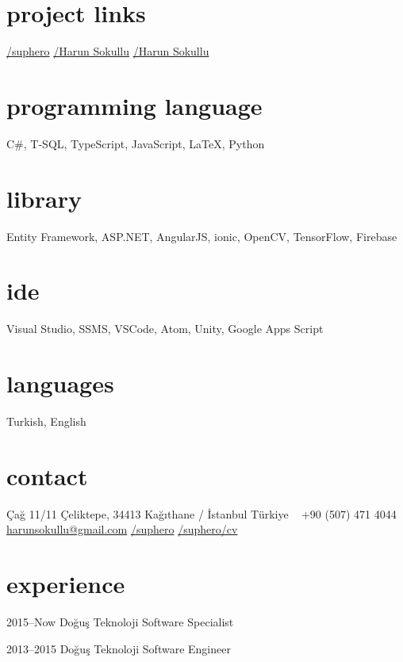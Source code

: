\documentclass[]{../friggeri-cv} %
\begin{document}

\begin{aside}
\section{project links}
\href{https://github.com/suphero}{\faGithub/suphero}
\href{https://play.google.com/store/apps/developer?id=Harun+Sokullu}{\faAndroid/Harun Sokullu}
\href{https://itunes.apple.com/tr/developer/harun-sokullu/id1265151811}{\faApple/Harun Sokullu}
\section{programming language}
C\#, T-SQL, TypeScript, JavaScript, \LaTeX, Python
\section{library}
Entity Framework, ASP.NET, AngularJS, ionic, OpenCV, TensorFlow, Firebase
\section{ide}
Visual Studio, SSMS, VSCode, Atom, Unity, Google Apps Script
\section{languages}
Turkish, English
\section{contact}
Çağ 11/11
Çeliktepe, 34413
Kağıthane / İstanbul
Türkiye
~
+90 (507) 471 4044
~
\href{mailto:harunsokullu@gmail.com}{harunsokullu@gmail.com}
\href{https://www.linkedin.com/in/suphero}{\faLinkedin/suphero}
\href{https://github.com/suphero/cv/raw/master/English/Harun\%20Sokullu.pdf}{\faGithub/suphero/cv}
~~
\end{aside}

\section{experience}

\begin{entrylist}

\entry
{2015--Now}
{Doğuş Teknoloji}
{}
{Software Specialist}

\entry
{2013--2015}
{Doğuş Teknoloji}
{}
{Software Engineer}

\end{entrylist}
\end{document}
